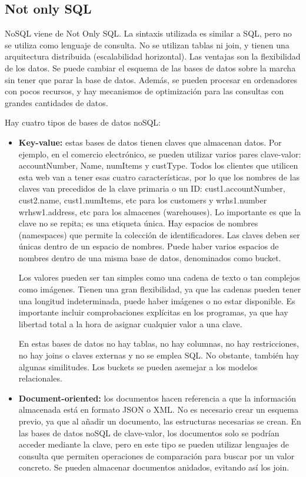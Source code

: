 \subsection{Not only SQL}
NoSQL viene de Not Only SQL. La sintaxis utilizada es similar a SQL, pero no se utiliza como lenguaje de consulta. No se utilizan tablas ni join, y tienen una arquitectura distribuida (escalabilidad horizontal). Las ventajas son la flexibilidad de los datos. Se puede cambiar el esquema de las bases de datos sobre la marcha sin tener que parar la base de datos. Además, se pueden procesar en ordenadores con pocos recursos, y hay mecanismos de optimización para las consultas con grandes cantidades de datos. 

Hay cuatro tipos de bases de datos noSQL:
\begin{itemize}
\item \textbf{Key-value:} estas bases de datos tienen claves que almacenan datos. Por ejemplo, en el comercio electrónico, se pueden utilizar varios pares clave-valor: accountNumber, Name, numItems y custType. Todos los clientes que utilicen esta web van a tener esas cuatro características, por lo que los nombres de las claves van precedidos de la clave primaria o un ID: cust1.accountNumber, cust2.name, cust1.numItems, etc para los customers y wrhs1.number wrhsw1.address, etc para los almacenes (warehouses). Lo importante es que la clave no se repita; es una etiqueta única. Hay espacios de nombres (namespaces) que permite la colección de identificadores. Las claves deben ser únicas dentro de un espacio de nombres. Puede haber varios espacios de nombres dentro de una misma base de datos, denominados como bucket. 

Los valores pueden ser tan simples como una cadena de texto o tan complejos como imágenes. Tienen una gran flexibilidad, ya que las cadenas pueden tener una longitud indeterminada, puede haber imágenes o no estar disponible. Es importante incluir comprobaciones explícitas en los programas, ya que hay libertad total a la hora de asignar cualquier valor a una clave.

En estas bases de datos no hay tablas, no hay columnas, no hay restricciones, no hay joins o claves externas y no se emplea SQL. No obstante, también hay algunas similitudes. Los buckets se pueden asemejar a los modelos relacionales.

\item \textbf{Document-oriented:} los documentos hacen referencia a que la información almacenada está en formato JSON o XML. No es necesario crear un esquema previo, ya que al añadir un documento, las estructuras necesarias se crean.  En las bases de datos noSQL de clave-valor, los documentos solo se podrían acceder mediante la clave, pero en este tipo se pueden utilizar lenguajes de consulta que permiten operaciones de comparación para buscar por un valor concreto. Se pueden almacenar documentos anidados, evitando así los join. 


\end{itemize}

